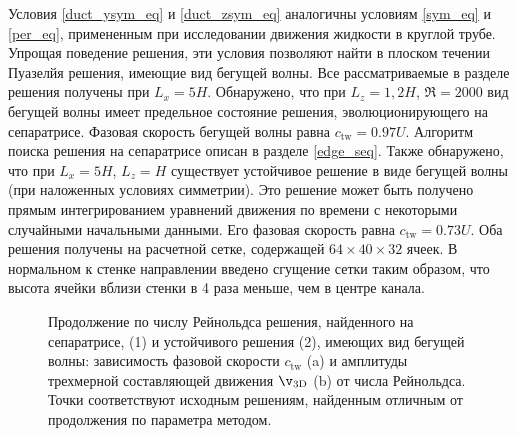 Условия \eqref{duct_ysym_eq} и \eqref{duct_zsym_eq} аналогичны условиям \eqref{sym_eq} и \eqref{per_eq}, примененным при исследовании движения жидкости в круглой трубе. Упрощая поведение решения, эти условия позволяют найти в плоском течении Пуазелйя решения, имеющие вид бегущей волны. Все рассматриваемые в разделе решения получены при $L_x = 5H$. Обнаружено, что при $L_z = 1{,}2H$, $\Re = 2000$ вид бегущей волны имеет предельное состояние решения, эволюционирующего на сепаратрисе. Фазовая скорость бегущей волны равна $c_\mathrm{tw}=0.97U$. Алгоритм поиска решения на сепаратрисе описан в разделе \ref{edge_seq}. Также обнаружено, что при $L_x = 5H$, $L_z = H$ существует устойчивое решение в виде бегущей волны (при наложенных условиях симметрии). Это решение может быть получено прямым интегрированием уравнений движения по времени с некоторыми случайными начальными данными. Его фазовая скорость равна $c_\mathrm{tw} = 0.73U$. Оба решения получены на расчетной сетке, содержащей $64 \times 40 \times 32$ ячеек. В нормальном к стенке направлении введено сгущение сетки таким образом, что высота ячейки вблизи стенки в 4 раза меньше, чем в центре канала. 

\begin{figure}
\caption{Продолжение по числу Рейнольдса решения, найденного на сепаратрисе, (1) и устойчивого решения (2), имеющих вид бегущей волны: зависимость фазовой скорости $c_\mathrm{tw}$ (a) и амплитуды трехмерной составляющей движения $\v_\mathrm{3D}$ (b) от числа Рейнольдса. Точки соответствуют исходным решениям, найденным отличным от продолжения по параметра методом.}
\label{ductTW_contin_pic}
\end{figure}

